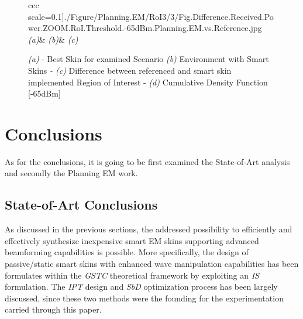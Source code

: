 \begin{figure}[H]
\begin{center}
\begin{tabular}{ccc}
  scale=0.1]{./Figure/Planning.EM/RoI3/3/Fig.Difference.Received.Power.ZOOM.RoI.Threshold.-65dBm.Planning.EM.vs.Reference.jpg}\tabularnewline
\emph{(a)}&
\emph{(b)}&
\emph{(c)}\tabularnewline
{}\tabularnewline
{}\tabularnewline
{}\tabularnewline
\end{tabular}\end{center}


\caption{\footnotesize \emph{(a)} - Best Skin for examined Scenario \emph{(b)} Environment with Smart Skins \emph{- (c)} Difference between
referenced and smart skin implemented Region of Interest - \emph{(d)}
Cumulative Density Function {[}-65dBm{]}}
\end{figure}

\textcolor{white}{\cite{Benoni:2021}\cite{Rocca:2022}\cite{Costa:2021}\cite{Gacanin:2020}\cite{Oliveri:2022}\cite{You:2021}\cite{Dai:2021}\cite{Liu:2021}\cite{Pei:2021}\cite{Zhang:2021}\cite{Dai:2021}}
\vspace{-20pt}

\chapter{Conclusions}
As for the conclusions, it is going to be first examined the State-of-Art analysis and secondly the Planning EM work.
\section{State-of-Art Conclusions}
As discussed in the previous sections, the addressed possibility to
efficiently and effectively synthesize inexpensive smart EM skins
supporting advanced beamforming capabilities is possible. More specifically,
the design of passive/static smart skins with enhanced wave manipulation
capabilities has been formulates within the \emph{GSTC} theoretical
framework by exploiting an \emph{IS} formulation. The \emph{IPT} design
and \emph{SbD} optimization process has been largely discussed, since
these two methods were the founding for the experimentation carried
through this paper. 

